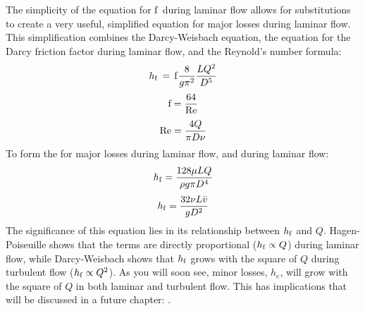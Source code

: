 \documentclass[letterpaper,10pt,english]{sphinxmanual}
\begin{document}
The simplicity of the equation for \(\rm{f}\) during laminar flow allows for substitutions to create a very useful, simplified equation for major losses during laminar flow. This simplification combines the Darcy-Weisbach equation, the equation for the Darcy friction factor during laminar flow, and the Reynold’s number formula:
\begin{equation}\label{equation:Fluids_Review/Fluids_Review_Design:Fluids_Review/Fluids_Review_Design:13}
\begin{split}h_{\rm{f}} \, = \,{\rm{f}} \frac{8}{g \pi^2} \frac{LQ^2}{D^5}\end{split}
\end{equation}\begin{equation}\label{equation:Fluids_Review/Fluids_Review_Design:Fluids_Review/Fluids_Review_Design:14}
\begin{split}{\rm{f}} = \frac{64}{\rm{Re}}\end{split}
\end{equation}\begin{equation}\label{equation:Fluids_Review/Fluids_Review_Design:Fluids_Review/Fluids_Review_Design:15}
\begin{split}{\rm{Re}}=\frac{4Q}{\pi D\nu}\end{split}
\end{equation}
To form the  for major losses during laminar flow, and  during laminar flow:
\begin{equation}\label{equation:Fluids_Review/Fluids_Review_Design:Fluids_Review/Fluids_Review_Design:16}
\begin{split}h_{\rm{f}} = \frac{128\mu L Q}{\rho g\pi D^4}\end{split}
\end{equation}\begin{equation}\label{equation:Fluids_Review/Fluids_Review_Design:Fluids_Review/Fluids_Review_Design:17}
\begin{split}h_{\rm{f}} = \frac{32\nu L\bar v}{ g D^2}\end{split}
\end{equation}
The significance of this equation lies in its relationship between \(h_{\rm{f}}\) and \(Q\). Hagen-Poiseuille shows that the terms are directly proportional (\(h_{\rm{f}} \propto Q\)) during laminar flow, while Darcy-Weisbach shows that \(h_{\rm{f}}\) grows with the square of \(Q\) during turbulent flow (\(h_{\rm{f}} \propto Q^2\)). As you will soon see, minor losses, \(h_e\), will grow with the square of \(Q\) in both laminar and turbulent flow. This has implications that will be discussed in a future chapter: {\hyperref[\detokenize{Flow_Control_and_Measurement/FCM_Design:flow-control-design}]{}}.
\end{document}
